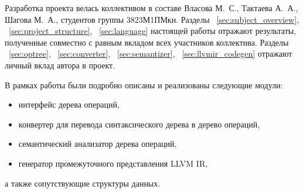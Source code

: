 Разработка проекта велась коллективом в составе Власова М.~С., Тактаева А.~А., Шагова М.~А., студентов группы 3823М1ПМкн.
Разделы ~\ref{sec:subject_overview}, ~\ref{sec:project_structure}, ~\ref{sec:language} настоящей работы отражают результаты, полученные совместно с равным вкладом всех участников коллектива.
Разделы ~\ref{sec:optree}, ~\ref{sec:converter}, ~\ref{sec:semantizer}, ~\ref{sec:llvmir_codegen} отражают личный вклад автора в проект.

В рамках работы были подробно описаны и реализованы следующие модули:

\begin{itemize}
    \item интерфейс дерева операций,
    \item конвертер для перевода синтаксического дерева в дерево операций,
    \item семантический анализатор дерева операций,
    \item генератор промежуточного представления LLVM IR,
\end{itemize}

а также сопутствующие структуры данных.
